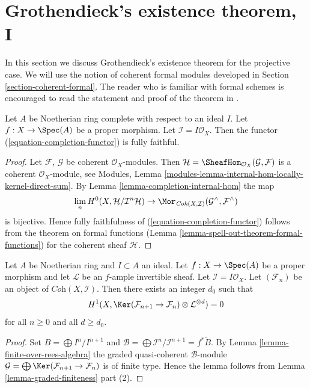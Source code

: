 \section{Grothendieck's existence theorem, I}
\label{section-existence}

\noindent
In this section we discuss Grothendieck's existence theorem for the
projective case. We will use the notion of coherent formal modules
developed in Section \ref{section-coherent-formal}. The reader who is familiar
with formal schemes is encouraged to read the statement and proof
of the theorem in \cite{EGA}.

\begin{lemma}
\label{lemma-fully-faithful}
Let $A$ be Noetherian ring complete with respect to an ideal $I$.
Let $f : X \to \Spec(A)$ be a proper morphism. Let
$\mathcal{I} = I\mathcal{O}_X$.
Then the functor (\ref{equation-completion-functor}) is fully faithful.
\end{lemma}

\begin{proof}
Let $\mathcal{F}$, $\mathcal{G}$ be coherent $\mathcal{O}_X$-modules.
Then $\mathcal{H} = \SheafHom_{\mathcal{O}_X}(\mathcal{G}, \mathcal{F})$
is a coherent $\mathcal{O}_X$-module, see
Modules, Lemma \ref{modules-lemma-internal-hom-locally-kernel-direct-sum}.
By Lemma \ref{lemma-completion-internal-hom} the map
$$
\lim_n H^0(X, \mathcal{H}/\mathcal{I}^n\mathcal{H})
\to
\Mor_{\textit{Coh}(X, \mathcal{I})}
(\mathcal{G}^\wedge, \mathcal{F}^\wedge)
$$
is bijective. Hence fully faithfulness of
(\ref{equation-completion-functor}) follows from the theorem on formal
functions (Lemma \ref{lemma-spell-out-theorem-formal-functions})
for the coherent sheaf $\mathcal{H}$.
\end{proof}

\begin{lemma}
\label{lemma-vanishing-projective}
Let $A$ be Noetherian ring and $I \subset A$ an ideal.
Let $f : X \to \Spec(A)$ be a proper morphism and let
$\mathcal{L}$ be an $f$-ample invertible sheaf. Let
$\mathcal{I} = I\mathcal{O}_X$. Let $(\mathcal{F}_n)$ be an
object of $\textit{Coh}(X, \mathcal{I})$. Then there exists an
integer $d_0$ such that
$$
H^1(X, \Ker(\mathcal{F}_{n + 1} \to \mathcal{F}_n)
\otimes \mathcal{L}^{\otimes d} )
= 0
$$
for all $n \geq 0$ and all $d \geq d_0$.
\end{lemma}

\begin{proof}
Set $B = \bigoplus I^n/I^{n + 1}$ and
$\mathcal{B} = \bigoplus \mathcal{I}^n/\mathcal{I}^{n + 1} = f^*\widetilde{B}$.
By Lemma \ref{lemma-finite-over-rees-algebra} the graded quasi-coherent
$\mathcal{B}$-module
$\mathcal{G} = \bigoplus \Ker(\mathcal{F}_{n + 1} \to \mathcal{F}_n)$
is of finite type. Hence the lemma follows from
Lemma \ref{lemma-graded-finiteness} part (2).
\end{proof}

